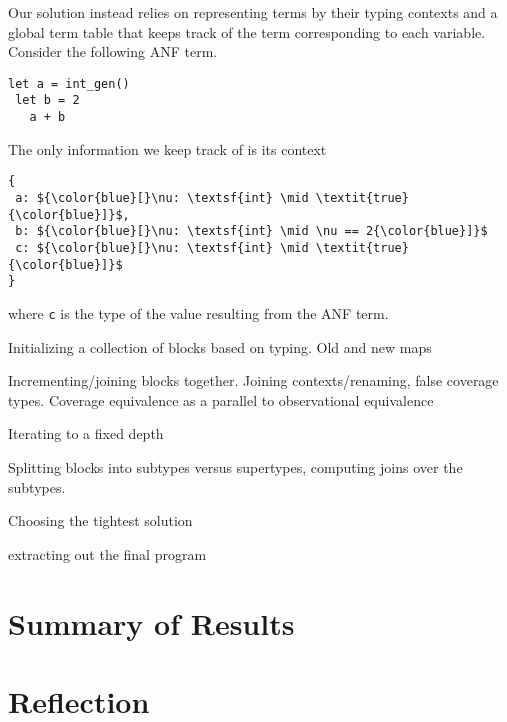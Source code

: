 \documentclass[review, sigplan]{acmart}
\begin{document}
Our solution instead relies on representing terms by their
typing contexts and a global term table that keeps track of
the term corresponding to each variable.
Consider the following ANF term.
\begin{lstlisting}[language=caml, basicstyle=\small\ttfamily]
let a = int_gen()
 let b = 2
   a + b
\end{lstlisting}
The only information we keep track of is its context

\begin{lstlisting}[language=caml, basicstyle=\small\ttfamily, mathescape]
{
 a: ${\color{blue}[}\nu: \textsf{int} \mid \textit{true}{\color{blue}]}$,
 b: ${\color{blue}[}\nu: \textsf{int} \mid \nu == 2{\color{blue}]}$
 c: ${\color{blue}[}\nu: \textsf{int} \mid \textit{true}{\color{blue}]}$
}
\end{lstlisting}
where \lstinline|c| is the type of the value resulting from the
ANF term.


Initializing a collection of blocks based on typing. Old and new maps

Incrementing/joining blocks together. Joining contexts/renaming, false coverage
types. Coverage equivalence as a parallel to observational equivalence

Iterating to a fixed depth

Splitting blocks into subtypes versus supertypes, computing joins over the
subtypes.

Choosing the tightest solution

extracting out the final program

\section{Summary of Results}

\section{Reflection}
\end{document}
